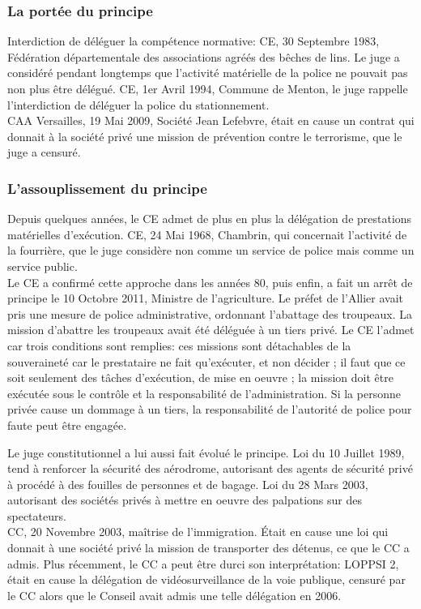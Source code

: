 \documentclass[10pt, a4paper, openany]{book}
\begin{document}
\subsubsection{La portée du principe}

Interdiction de déléguer la compétence normative: CE, 30 Septembre 1983, Fédération départementale des associations agréés des bêches de lins. Le juge a considéré pendant longtemps que l'activité matérielle de la police ne pouvait pas non plus être délégué. CE, 1er Avril 1994, Commune de Menton, le juge rappelle l'interdiction de déléguer la police du stationnement. \\
CAA Versailles, 19 Mai 2009, Société Jean Lefebvre, était en cause un contrat qui donnait à la société privé une mission de prévention contre le terrorisme, que le juge a censuré.

\subsubsection{L'assouplissement du principe}

Depuis quelques années, le CE admet de plus en plus la délégation de prestations matérielles d'exécution. CE, 24 Mai 1968, Chambrin, qui concernait l'activité de la fourrière, que le juge considère non comme un service de police mais comme un service public. \\
Le CE a confirmé cette approche dans les années 80, puis enfin, a fait un arrêt de principe le 10 Octobre 2011, Ministre de l'agriculture. Le préfet de l'Allier avait pris une mesure de police administrative, ordonnant l'abattage des troupeaux. La mission d'abattre les troupeaux avait été déléguée à un tiers privé. Le CE l'admet car trois conditions sont remplies: ces missions sont détachables de la souveraineté car le prestataire ne fait qu'exécuter, et non décider ; il faut que ce soit seulement des tâches d'exécution, de mise en oeuvre ; la mission doit être exécutée sous le contrôle et la responsabilité de l'administration. Si la personne privée cause un dommage à un tiers, la responsabilité de l'autorité de police pour faute peut être engagée.


Le juge constitutionnel a lui aussi fait évolué le principe. Loi du 10 Juillet 1989, tend à renforcer la sécurité des aérodrome, autorisant des agents de sécurité privé à procédé à des fouilles de personnes et de bagage. Loi du 28 Mars 2003, autorisant des sociétés privés à mettre en oeuvre des palpations sur des spectateurs. \\
CC, 20 Novembre 2003, maîtrise de l'immigration. Était en cause une loi qui donnait à une société privé la mission de transporter des détenus, ce que le CC a admis. Plus récemment, le CC a peut être durci son interprétation: LOPPSI 2, était en cause la délégation de vidéosurveillance de la voie publique, censuré par le CC alors que le Conseil avait admis une telle délégation en 2006. 
\end{document}
